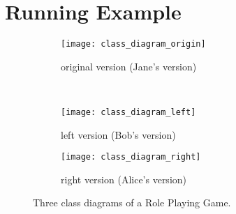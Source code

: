 
\section{Running Example}
\label{sec:running_example_1}

\begin{figure}[ht]
  \centering
  \begin{subfigure}[t]{0.45\linewidth}
    \texttt{[image: class\_diagram\_origin]}
    \caption{original version (Jane's version)}
    \label{fig:class_diagram_origin}
  \end{subfigure}
  \\
  \begin{subfigure}[t]{0.45\linewidth}
    \texttt{[image: class\_diagram\_left]}
    \caption{left version (Bob's version)}
    \label{fig:class_diagram_left}
  \end{subfigure}
  \hfill
  \begin{subfigure}[t]{0.45\linewidth}
    \texttt{[image: class\_diagram\_right]}
    \caption{right version (Alice's version)}
    \label{fig:class_diagram_right}
  \end{subfigure}
  \caption{Three class diagrams of a Role Playing Game.}
  \label{fig:class_diagram_rpg}
\end{figure}

